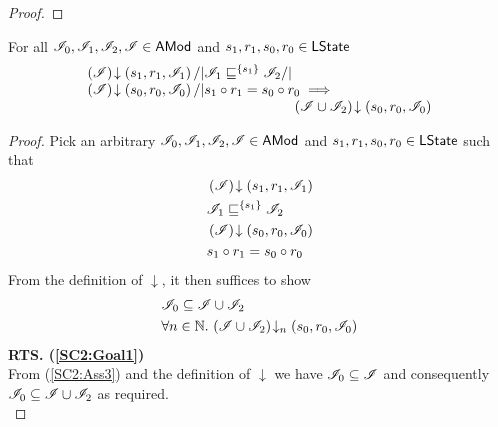 \begin{lemma}
\begin{proof}
\end{proof}
\end{lemma}
%
%
%
%
%
%
\begin{lemma}\label{lem:shift-closure-2}
For all $\mathscr{I}_0, \mathscr{I}_1, \mathscr{I}_2, \mathscr{I} \in \textsf{AMod}$ and  $s_1, r_1, s_0, r_0 \in \textsf{LState}$
%
\[
\begin{array}{@{} l @{\hspace{-1cm}} l @{} } 
	\extendsAM{\lmod}{s_1}{r_1}{\lmod_1} /| \lmod_1 \weakenI{\{s_1\}} \lmod_2 /| \null & \\
	\extendsAM{\lmod}{s_0}{r_0}{\lmod_0} /| s_1 \composeL r_1 = s_0 \composeL r_0 \implies & \\
	&\extendsAM{\lmod \cup \lmod_2}{s_0}{r_0}{\lmod_0}
\end{array}
\]
%
\begin{proof} Pick an arbitrary $\mathscr{I}_0, \mathscr{I}_1, \mathscr{I}_2, \mathscr{I} \in \textsf{AMod}$ and $s_1, r_1, s_0, r_0 \in \textsf{LState}$ such that 
%
\begin{align}
	& \left(\mathscr{I}\right) \!\downarrow \left(s_1, r_1, \mathscr{I}_1\right) \label{SC2:Ass1}\\
	& \mathscr{I}_1 \sqsubseteq^{\{s_1\}} \mathscr{I}_2 \label{SC2:Ass2}\\
	& \left(\mathscr{I}\right) \!\downarrow \left(s_0, r_0, \mathscr{I}_0\right) \label{SC2:Ass3}\\
	& s_1 \circ r_1 = s_0 \circ r_0 \label{SC2:Ass4}
\end{align} 
%
From the definition of $\downarrow$, it then suffices to show
%
\begin{align}
	& \mathscr{I}_0 \subseteq \mathscr{I} \cup \mathscr{I}_2\label{SC2:Goal1}\\
	& \forall n \in \mathbb{N}.\,  \left(\mathscr{I} \cup \mathscr{I}_2\right) \!\downarrow_{n} \left(s_0, r_0, \mathscr{I}_0\right) \label{SC2:Goal2}
\end{align}
%
\noindent\textbf{RTS. (\ref{SC2:Goal1})} \\
From (\ref{SC2:Ass3}) and the definition of $\downarrow$ we have $\mathscr{I}_0 \subseteq \mathscr{I}$ and consequently $\mathscr{I}_0 \subseteq \mathscr{I} \cup \mathscr{I}_2$ as required.\\


\end{proof}
\end{lemma}
